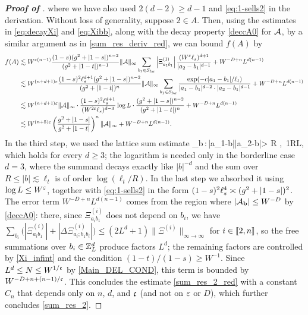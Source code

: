 \begin{proof}[\bf Proof of ]
\ee
where we have also used $2(d-2)\ge d-1$ and \eqref{eq:1-sells2} in the derivation. 
Without loss of generality, suppose $2\in A$. Then, using the estimates in \eqref{eq:decayXi} and \eqref{eq:Xibb}, along with the decay property \eqref{deccA0} for $\cal A$, by a similar argument as in \eqref{sum_res_deriv_red}, we can bound $f(A)$ by 
\begin{align}
f(A)&\lesssim W^{\e (n-1)} \frac{(1-s)(\ilambda^2+|1-s|)^{n-2}}{(\ilambda^2+|1-t|)^{n-1}}  \|\cal A\|_\infty 
\sum_{b_1\in S_{\mathrm{far}}} \left|\Xi^{(1)}_{a_1b_1}\right| \frac{ (W^\e\ell_s)^{d+1}}{|a_2-b_1|^{d-1}} + W^{-D+n}L^{d(n-1)}\nonumber\\
&\lesssim  W^{(n+d+1) \e }\frac{(1-s)^2\ell_s^{d+1}(\ilambda^2+|1-s|)^{n-2}}{(\ilambda^2+|1-t|)^{n}}  \|\cal A\|_\infty  
\sum_{b_1\in S_{\mathrm{far}}} \frac{\exp(-c|a_1-b_1|/\ell_t)}{|a_1-b_1|^{d-2} \cdot |a_2-b_1|^{d-1}} + W^{-D+n}L^{d(n-1)} \nonumber\\
&\lesssim  W^{(n+d+1)\e } \|\cal A\|_\infty \cdot  \frac{(1-s)^2\ell_s^{d+1}}{(W^{2\e}\ell_s)^{d-3}}\log L\cdot \frac{(\ilambda^2+|1-s|)^{n-2}}{(\ilambda^2+|1-t|)^{n}} + W^{-D+n}L^{d(n-1)} \nonumber\\
&\lesssim W^{(n+5)\e }  \p{\frac{\ilambda^2+|1-s|}{\ilambda^2+|1-t|}}^{n} \|\cal A\|_\infty+ W^{-D+n}L^{d(n-1)}. 
\label{eq:bddfA}
\end{align}
In the third step, we used the lattice sum estimate
\be\label{eq:latticesum_d3}
\sum_{b\,:\,|a_1-b|\wedge|a_2-b|> R}  \lesssim {},\quad \forall\, 1\le R\le L,
\ee
which holds for every $d\ge 3$; the logarithm is needed only in the borderline case $d=3$, where the summand decays exactly like $|b|^{-d}$ and the sum over $R\le |b|\lesssim \ell_t$ is of order $\log(\ell_t/R)$. In the last step we absorbed it using $\log L\le W^{\e}$, together with \eqref{eq:1-sells2} in the form $(1-s)^2\ell_s^4\asymp(\ilambda^2+|1-s|)^2$. The error term $W^{-D+n}L^{d(n-1)}$ comes from the region where $|\cal A_{\mathbf b}|\le W^{-D}$ by \eqref{deccA0}: there, since $\Xi^{(i)}_{a_ib_1}$ does not depend on $b_i$, we have $\sum_{b_i}\big(|\Xi^{(i)}_{a_ib_1}|+|\Delta \Xi^{(i)}_{a_i;b_1b_i}|\big)\le (2L^d+1)\|\Xi^{(i)}\|_{\infty\to\infty}$ for $i\in\qqq{2,n}$, so the free summations over $b_i\in\Zn$ produce factors $L^d$; the remaining factors are controlled by \eqref{Xi_infint} and the condition $(1-t)/(1-s)\ge W^{-1}$. Since $L^d\le N\le W^{1/\fc}$ by \eqref{Main_DEL_COND}, this term is bounded by $W^{-D+n+(n-1)/\fc}$. 
This concludes the estimate \eqref{sum_res_2_red} with a constant $C_n$ that depends only on $n$, $d$, and $\fc$ (and not on $\e$ or $D$), which further concludes \eqref{sum_res_2}. 
\end{proof}

